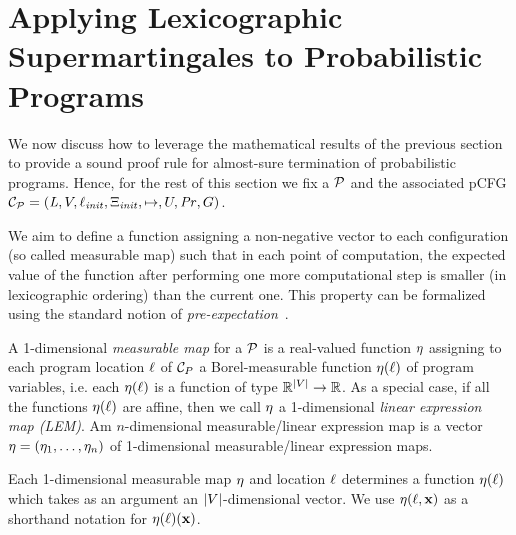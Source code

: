 \section{Applying Lexicographic Supermartingales to Probabilistic Programs}

We now discuss how to leverage the mathematical results of the previous section 
to provide a sound proof rule for almost-sure termination of probabilistic 
programs. Hence, for the rest of this section we fix a \PP{} $\mathcal{P}$ and the 
associated pCFG 
$\mathcal{C}_{\mathcal{P}}=(\mathit{L},V,\ell_{\mathit{init}},\Xi_{\mathit{init}},\mapsto,U,\mathit{Pr},G)$.

We aim to define a function assigning a non-negative vector to each configuration (so called measurable map) such that in each point of computation, the expected value of the function after performing one more computational step is smaller (in lexicographic ordering) than the current one. This property can be formalized using the standard  notion of \emph{pre-expectation}~\cite{xxx}.

\begin{definition}
A 1-dimensional \emph{measurable map} for a \PP{} $\mathcal{P}$ is a  
real-valued function $\eta$ 
assigning to each program location $\ell$ of $\mathcal{C}_P$ a Borel-measurable function $\eta(\ell)$  of program variables, i.e. each $\eta(\ell)$  is a function of type $\mathbb{R}^{|V|}\rightarrow \mathbb{R}$. As a special case, if all the functions $\eta(\ell)$ are affine, then we call $\eta$ a 1-dimensional \emph{linear expression map (LEM)}. 
Am $n$-dimensional measurable/linear expression map is a vector $\mathbf{\eta}=(\eta_1,\dots,\eta_n)$ of 1-dimensional measurable/linear expression maps. 
\end{definition}

Each 1-dimensional measurable map $\eta$ and location $\ell$ determines a function $\eta(\ell)$ 
which takes as an argument an $|V|$-dimensional vector. We use $\eta(\ell,\mathbf{x})$ as a shorthand 
notation for $\eta(\ell)(\mathbf{x})$.

